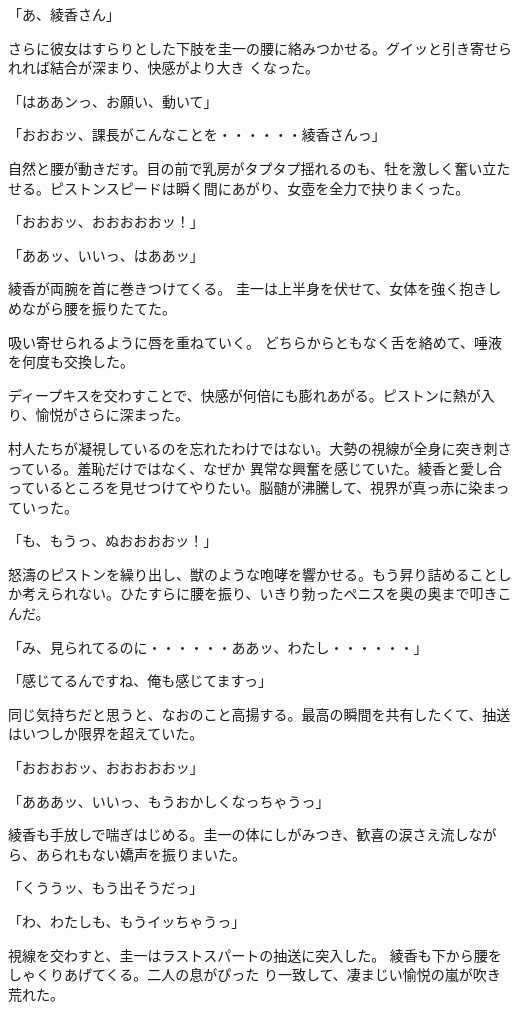 ﻿\documentclass[book,tate]{jlreq}
\begin{document}
「あ、綾香さん」

さらに彼女はすらりとした下肢を圭一の腰に絡みつかせる。グイッと引き寄せられれば結合が深まり、快感がより大き くなった。

「はああンっ、お願い、動いて」

「おおおッ、課長がこんなことを・・・・・・綾香さんっ」

自然と腰が動きだす。目の前で乳房がタプタプ揺れるのも、牡を激しく奮い立たせる。ピストンスピードは瞬く間にあがり、女壺を全力で抉りまくった。

「おおおッ、おおおおおッ！」

「ああッ、いいっ、はああッ」

綾香が両腕を首に巻きつけてくる。 圭一は上半身を伏せて、女体を強く抱きしめながら腰を振りたてた。

吸い寄せられるように唇を重ねていく。 どちらからともなく舌を絡めて、唾液を何度も交換した。

ディープキスを交わすことで、快感が何倍にも膨れあがる。ピストンに熱が入り、愉悦がさらに深まった。

村人たちが凝視しているのを忘れたわけではない。大勢の視線が全身に突き刺さっている。羞恥だけではなく、なぜか 異常な興奮を感じていた。綾香と愛し合っているところを見せつけてやりたい。脳髄が沸騰して、視界が真っ赤に染まっていった。

「も、もうっ、ぬおおおおッ！」

怒濤のピストンを繰り出し、獣のような咆哮を響かせる。もう昇り詰めることしか考えられない。ひたすらに腰を振り、いきり勃ったペニスを奥の奥まで叩きこんだ。

「み、見られてるのに・・・・・・ああッ、わたし・・・・・・」

「感じてるんですね、俺も感じてますっ」

同じ気持ちだと思うと、なおのこと高揚する。最高の瞬間を共有したくて、抽送はいつしか限界を超えていた。

「おおおおッ、おおおおおッ」

「あああッ、いいっ、もうおかしくなっちゃうっ」

綾香も手放しで喘ぎはじめる。圭一の体にしがみつき、歓喜の涙さえ流しながら、あられもない嬌声を振りまいた。

「くううッ、もう出そうだっ」

「わ、わたしも、もうイッちゃうっ」

視線を交わすと、圭一はラストスパートの抽送に突入した。 綾香も下から腰をしゃくりあげてくる。二人の息がぴった り一致して、凄まじい愉悦の嵐が吹き荒れた。
\end{document}
